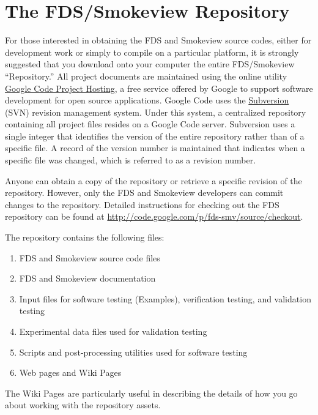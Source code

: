 \documentclass[11pt]{book}
\begin{document}
\chapter{The FDS/Smokeview Repository}

For those interested in obtaining the FDS and Smokeview source codes, either for development work or simply to compile on a particular platform,
it is strongly suggested that you download onto your computer the entire FDS/Smokeview ``Repository.''
All project documents are maintained using the online utility \href{http://code.google.com/opensource}{{Google Code Project Hosting}}, a free service offered
by Google to support software development for open source applications.  Google Code uses the \href{http://subversion.apache.org/}{{Subversion}} (SVN) revision management system.
Under this system, a centralized repository containing all project files resides on a Google Code server.  Subversion uses a single integer that
identifies the version of the entire repository rather than of a specific file.
A record of the version number is maintained that indicates when a specific file was changed, which is referred to as a revision number.

Anyone can obtain a copy of the repository or retrieve a specific revision of the
repository.  However, only the FDS and Smokeview developers can commit changes to the repository.
Detailed instructions for checking out the FDS repository can be found at
\href{http://code.google.com/p/fds-smv/source/checkout}{{http://code.google.com/p/fds-smv/source/checkout}}.

The repository contains the following files:
\begin{enumerate}
\item FDS and Smokeview source code files
\item FDS and Smokeview documentation
\item Input files for software testing (Examples), verification testing, and validation testing
\item Experimental data files used for validation testing
\item Scripts and post-processing utilities used for software testing
\item Web pages and Wiki Pages
\end{enumerate}
The Wiki Pages are particularly useful in describing the details of how you go about working with the repository assets.
\end{document}
